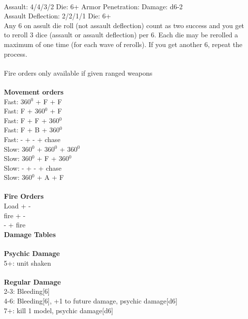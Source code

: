 \ \\
Assault: 4/4/3/2 Die: 6+ Armor Penetration:  Damage: d6-2 \\
Assault Deflection: 2/2/1/1 Die: 6+\\
\indent Any 6 on assult die roll (not assault deflection) count as two success and you get to reroll 3 dice (assault or assault deflection) per 6. Each die may be rerolled a maximum of one time (for each wave of rerolls). If you get another 6, repeat the process.  \\
\ \\
Fire orders only available if given ranged weapons
\ \\


\ \\ {\bf Movement orders } \\
Fast: 360$^0$ + F + F \\
Fast: F + 360$^0$ + F \\
Fast: F + F + 360$^0$ \\
Fast: F + B + 360$^0$ \\
Fast: - + - + chase \\
Slow: 360$^0$ + 360$^0$ + 360$^0$ \\
Slow: 360$^0$ + F + 360$^0$ \\
Slow: - + - + chase \\
Slow: 360$^0$ + A + F \\
\ \\ {\bf Fire Orders } \\
Load + - \\
fire + - \\
- + fire \\



{\bf Damage Tables} \\
\ \\ {\bf Psychic Damage } \\
5+: unit shaken \\
\ \\ {\bf Regular Damage } \\
2-3: Bleeding[6] \\
4-6: Bleeding[6], +1 to future damage, psychic damage[d6] \\
7+: kill 1 model, psychic damage[d6] \\









\pagebreak

